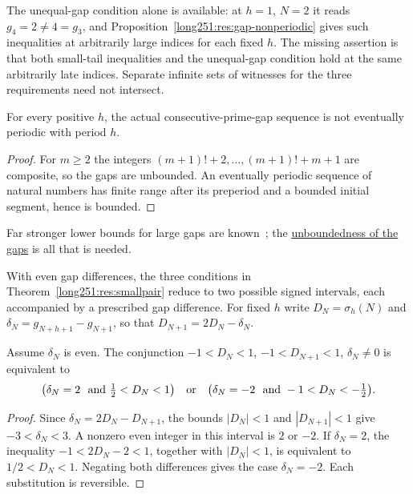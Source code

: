 \documentclass[11pt]{article}
\begin{document}
The unequal-gap condition alone is available: at $h=1$, $N=2$ it reads
$g_4=2\ne4=g_3$, and Proposition~\ref{long251:res:gap-nonperiodic}
gives such inequalities at arbitrarily large indices for each fixed $h$.
The missing assertion is that both small-tail inequalities and the
unequal-gap condition hold at the same arbitrarily late indices.
Separate infinite sets of witnesses for the three requirements need not
intersect.

\begin{proposition}\label{long251:res:gap-nonperiodic}\label{res:gap-nonperiodic}
For every positive $h$, the actual consecutive-prime-gap sequence is not
eventually periodic with period $h$.
\end{proposition}

\begin{proof}
For $m\ge2$ the integers $(m+1)!+2,\ldots,(m+1)!+m+1$ are composite, so the
gaps are unbounded.  An eventually periodic sequence of natural numbers has
finite range after its preperiod and a bounded initial segment, hence is
bounded.
\end{proof}

\noindent Far stronger lower bounds for large gaps are
known~\cite[Theorem~1]{fgkmt2018}; the
\href{https://github.com/wcook04/plectis-erdos/blob/3d6d938d696fed0fb71dd55115a18a73738ff223/lean/ErdosProblems/Erdos251/PrimeGapDyadicTail.lean\#L57}{unboundedness
of the gaps} is all that is needed.

With even gap differences, the three conditions in
Theorem~\ref{long251:res:smallpair} reduce to two possible signed intervals,
each accompanied by a prescribed gap difference.  For fixed $h$ write
$D_N=\sigma_h(N)$ and $\delta_N=g_{N+h+1}-g_{N+1}$, so that
$D_{N+1}=2D_N-\delta_N$.

\begin{theorem}\label{long251:res:signedwindow}
Assume $\delta_N$ is even.  The conjunction
$-1<D_N<1$, $-1<D_{N+1}<1$, $\delta_N\ne0$ is equivalent to
\[
 \bigl(\delta_N=2\ \hbox{ and }\tfrac12<D_N<1\bigr)
 \quad\hbox{or}\quad
 \bigl(\delta_N=-2\ \hbox{ and }-1<D_N<-\tfrac12\bigr).
\]
\end{theorem}

\begin{proof}
Since $\delta_N=2D_N-D_{N+1}$, the bounds $|D_N|<1$ and
$|D_{N+1}|<1$ give $-3<\delta_N<3$.  A nonzero even integer in this
interval is $2$ or $-2$.  If $\delta_N=2$, the inequality
$-1<2D_N-2<1$, together with $|D_N|<1$, is equivalent to
$1/2<D_N<1$.  Negating both differences gives the case $\delta_N=-2$.
Each substitution is reversible.
\end{proof}
\end{document}

